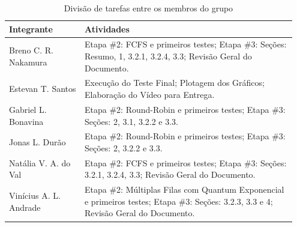\documentclass[12pt]{article}
\begin{document}
\begin{table}[H]
\centering
\caption{Divisão de tarefas entre os membros do grupo}
\label{tab:divisao_tarefas}

\begin{tabular}{|p{0.25\linewidth}|p{0.7\linewidth}|}
\hline
\textbf{Integrante} & \textbf{Atividades} \\ \hline

Breno C. R. Nakamura & Etapa \#2: FCFS e primeiros testes; \newline 
Etapa \#3: Seções: Resumo, 1, 3.2.1, 3.2.4, 3.3; Revisão Geral do Documento. \\ \hline

Estevan T. Santos & Execução do Teste Final; Plotagem dos Gráficos; Elaboração do Vídeo para Entrega. \\ \hline

Gabriel L. Bonavina & 
Etapa \#2: Round-Robin e primeiros testes; \newline 
Etapa \#3: Seções: 2, 3.1, 3.2.2 e 3.3. \\ \hline

Jonas L. Durão & 
Etapa \#2: Round-Robin e primeiros testes; \newline 
Etapa \#3: Seções: 2, 3.2.2 e 3.3. \\ \hline

Natália V. A. do Val & Etapa \#2: FCFS e primeiros testes; \newline 
Etapa \#3: Seções: 3.2.1, 3.2.4, 3.3; Revisão Geral do Documento. \\ \hline

Vinícius A. L. Andrade & Etapa \#2: Múltiplas Filas com Quantum Exponencial e primeiros testes; \newline 
Etapa \#3: Seções: 3.2.3, 3.3 e 4; Revisão Geral do Documento. \\ \hline

\end{tabular}
\end{table}






\end{document}
